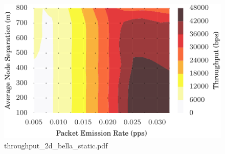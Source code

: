 \documentclass{article}
\begin{document}
\begin{figure}[h!]
\centering
\includegraphics[width=\linewidth]{throughput_2d_bella_static.pdf}
\caption{throughput\_2d\_bella\_static.pdf}
\end{figure}
\end{document}
